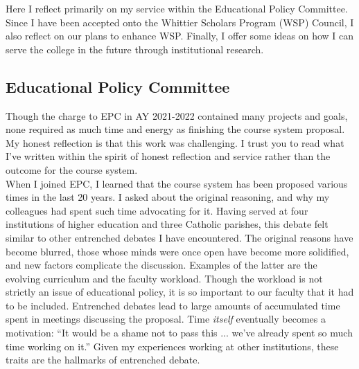 \documentclass[../../../main.tex]{subfiles}
\begin{document}
\label{sec:committee_service}

Here I reflect primarily on my service within the Educational Policy Committee.  Since I have been accepted onto the Whittier Scholars Program (WSP) Council, I also reflect on our plans to enhance WSP.  Finally, I offer some ideas on how I can serve the college in the future through institutional research.

\subsection{Educational Policy Committee}

Though the charge to EPC in AY 2021-2022 contained many projects and goals, none required as much time and energy as finishing the course system proposal.  My honest reflection is that this work was challenging.  I trust you to read what I've written within the spirit of honest reflection and service rather than the outcome for the course system.
\\
\vspace{0.15cm}
When I joined EPC, I learned that the course system has been proposed various times in the last 20 years.  I asked about the original reasoning, and why my colleagues had spent such time advocating for it.  Having served at four institutions of higher education and three Catholic parishes, this debate felt similar to other entrenched debates I have encountered.  The original reasons have become blurred, those whose minds were once open have become more solidified, and new factors complicate the discussion.  Examples of the latter are the evolving curriculum and the faculty workload.  Though the workload is not strictly an issue of educational policy, it is so important to our faculty that it had to be included.  Entrenched debates lead to large amounts of accumulated time spent in meetings discussing the proposal.  Time \textit{itself} eventually becomes a motivation: ``It would be a shame not to pass this ... we've already spent so much time working on it.''  Given my experiences working at other institutions, these traits are the hallmarks of entrenched debate.
\\
\vspace{0.15cm}
\end{document}
